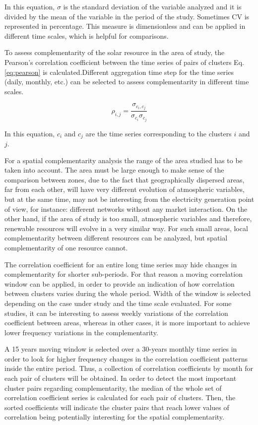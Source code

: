 In this equation, $\sigma$ is the standard deviation of the variable analyzed and it is divided by the mean of the variable in the period of the study. Sometimes CV is represented in percentage. This measure is dimensionless and can be applied in different time scales, which is helpful for comparisons.

To assess complementarity of the solar resource in the area of study, the Pearson's correlation coefficient between the time series of pairs of clusters Eq.\ref{eq:pearson} is calculated.Different aggregation time step for the time series (daily, monthly, etc.) can be selected to assess complementarity in different time scales. 

\begin{equation}\label{eq:pearson}
  \rho_{i,j}=\frac{\sigma_{c_i,c_j}}{\sigma_{c_i}\sigma_{c_j}}
\end{equation}

In this equation, $c_i$ and $c_j$ are the time series corresponding to the clusters $i$ and $j$.

For a spatial complementarity analysis the range of the area studied has to be taken into account. The area must be large enough to make sense of the comparison between zones, due to the fact that geographically dispersed areas, far from each other, will have very different evolution of atmospheric variables, but at the same time, may not be interesting from the electricity generation point of view, for instance: different networks without any market interaction. On the other hand, if the area of study is too small, atmospheric variables and therefore, renewable resources will evolve in a very similar way. For such small areas, local complementarity between different resources can be analyzed, but spatial complementarity of one resource cannot.

The correlation coefficient for an entire long time series may hide changes in complementarity for shorter sub-periods. For that reason a moving correlation window can be applied, in order to provide an indication of how correlation between clusters varies during the whole period. Width of the window is selected depending on the case under study and the time scale evaluated. For some studies, it can be interesting to assess weekly variations of the correlation coefficient between areas, whereas in other cases, it is more important to achieve lower frequency variations in the complementarity.

A 15 years moving window is selected over a 30-years monthly time series in order to look for higher frequency changes in the correlation coefficient patterns inside the entire period. Thus, a collection of correlation coefficients by month for each pair of clusters will be obtained. In order to detect the most important cluster pairs regarding complementarity, the median of the whole set of correlation coefficient series is calculated for each pair of clusters. Then, the  sorted coefficients will indicate the cluster pairs that reach lower values of correlation being potentially interesting for the spatial complementarity.

